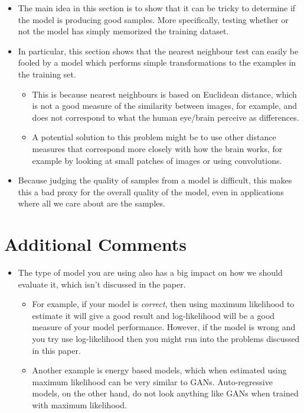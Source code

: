 \documentclass{article}
\begin{document}
\begin{itemize}
	\item The main idea in this section is to show that it can be tricky to determine if the model is producing good samples. More specifically, testing whether or not the model has simply memorized the training dataset.
	
	\item In particular, this section shows that the nearest neighbour test can easily be fooled by a model which performs simple transformations to the examples in the training set. 	
	\begin{itemize}
		\item This is because nearest neighbours is based on Euclidean distance, which is not a good measure of the similarity between images, for example, and does not correspond to what the human eye/brain perceive as differences. 
		
		\item A potential solution to this problem might be to use other distance measures that correspond more closely with how the brain works, for example by looking at small patches of images or using convolutions.
	\end{itemize}

	\item Because judging the quality of samples from a model is difficult, this makes this a bad proxy for the overall quality of the model, even in applications where all we care about are the samples.
\end{itemize}

\section{Additional Comments}

\begin{itemize}
	\item The type of model you are using also has a big impact on how we should evaluate it, which isn't discussed in the paper.
	\begin{itemize}
		\item For example, if your model is \emph{correct}, then using maximum likelihood to estimate it will give a good result and log-likelihood will be a good measure of your model performance. However, if the model is wrong and you try use log-likelihood then you might run into the problems discussed in this paper.
		
		\item Another example is energy based models, which when estimated using maximum likelihood can be very similar to GANs. Auto-regressive models, on the other hand, do not look anything like GANs when trained with maximum likelihood.
	\end{itemize}
\end{itemize}
\end{document}
